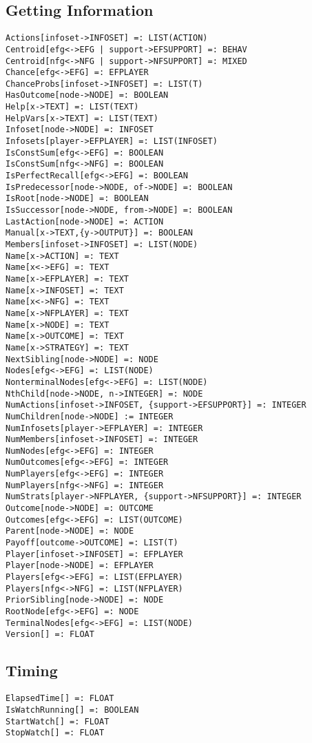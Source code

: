 \subsection{Getting Information}

\begin{verbatim}
Actions[infoset->INFOSET] =: LIST(ACTION)
Centroid[efg<->EFG | support->EFSUPPORT] =: BEHAV
Centroid[nfg<->NFG | support->NFSUPPORT] =: MIXED
Chance[efg<->EFG] =: EFPLAYER
ChanceProbs[infoset->INFOSET] =: LIST(T)
HasOutcome[node->NODE] =: BOOLEAN
Help[x->TEXT] =: LIST(TEXT)
HelpVars[x->TEXT] =: LIST(TEXT)
Infoset[node->NODE] =: INFOSET
Infosets[player->EFPLAYER] =: LIST(INFOSET)
IsConstSum[efg<->EFG] =: BOOLEAN
IsConstSum[nfg<->NFG] =: BOOLEAN
IsPerfectRecall[efg<->EFG] =: BOOLEAN
IsPredecessor[node->NODE, of->NODE] =: BOOLEAN
IsRoot[node->NODE] =: BOOLEAN
IsSuccessor[node->NODE, from->NODE] =: BOOLEAN
LastAction[node->NODE] =: ACTION
Manual[x->TEXT,{y->OUTPUT}] =: BOOLEAN
Members[infoset->INFOSET] =: LIST(NODE)
Name[x->ACTION] =: TEXT
Name[x<->EFG] =: TEXT
Name[x->EFPLAYER] =: TEXT
Name[x->INFOSET] =: TEXT
Name[x<->NFG] =: TEXT
Name[x->NFPLAYER] =: TEXT
Name[x->NODE] =: TEXT
Name[x->OUTCOME] =: TEXT
Name[x->STRATEGY] =: TEXT
NextSibling[node->NODE] =: NODE
Nodes[efg<->EFG] =: LIST(NODE)
NonterminalNodes[efg<->EFG] =: LIST(NODE)
NthChild[node->NODE, n->INTEGER] =: NODE
NumActions[infoset->INFOSET, {support->EFSUPPORT}] =: INTEGER
NumChildren[node->NODE] := INTEGER
NumInfosets[player->EFPLAYER] =: INTEGER
NumMembers[infoset->INFOSET] =: INTEGER
NumNodes[efg<->EFG] =: INTEGER
NumOutcomes[efg<->EFG] =: INTEGER
NumPlayers[efg<->EFG] =: INTEGER
NumPlayers[nfg<->NFG] =: INTEGER
NumStrats[player->NFPLAYER, {support->NFSUPPORT}] =: INTEGER
Outcome[node->NODE] =: OUTCOME
Outcomes[efg<->EFG] =: LIST(OUTCOME)
Parent[node->NODE] =: NODE
Payoff[outcome->OUTCOME] =: LIST(T)
Player[infoset->INFOSET] =: EFPLAYER
Player[node->NODE] =: EFPLAYER
Players[efg<->EFG] =: LIST(EFPLAYER)
Players[nfg<->NFG] =: LIST(NFPLAYER)
PriorSibling[node->NODE] =: NODE
RootNode[efg<->EFG] =: NODE
TerminalNodes[efg<->EFG] =: LIST(NODE)
Version[] =: FLOAT
\end{verbatim}

\subsection{Timing}

\begin{verbatim}
ElapsedTime[] =: FLOAT
IsWatchRunning[] =: BOOLEAN
StartWatch[] =: FLOAT
StopWatch[] =: FLOAT
\end{verbatim}

